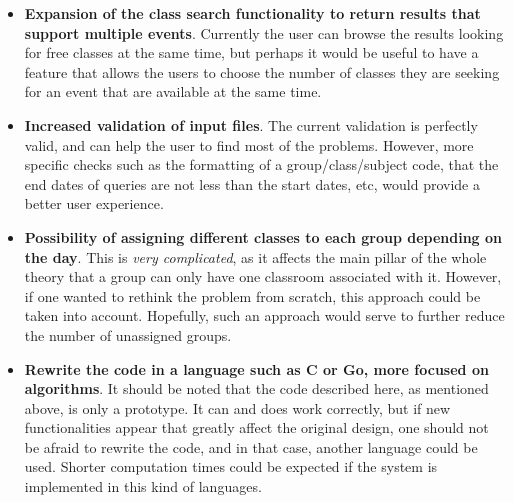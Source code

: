 \begin{itemize}
    \item \textbf{Expansion of the class search functionality to return results that support multiple events}. Currently the user can browse the results looking for free classes at the same time, but perhaps it would be useful to have a feature that allows the users to choose the number of classes they are seeking for an event that are available at the same time.
    \item \textbf{Increased validation of input files}. The current validation is perfectly valid, and can help the user to find most of the problems. However, more specific checks such as the formatting of a group/class/subject code, that the end dates of queries are not less than the start dates, etc, would provide a better user experience.
    \item \textbf{Possibility of assigning different classes to each group depending on the day}. This is \textit{very complicated}, as it affects the main pillar of the whole theory that a group can only have one classroom associated with it. However, if one wanted to rethink the problem from scratch, this approach could be taken into account. Hopefully, such an approach would serve to further reduce the number of unassigned groups.
    \item \textbf{Rewrite the code in a language such as C or Go, more focused on algorithms}. It should be noted that the code described here, as mentioned above, is only a prototype. It can and does work correctly, but if new functionalities appear that greatly affect the original design, one should not be afraid to rewrite the code, and in that case, another language could be used. Shorter computation times could be expected if the system is implemented in this kind of languages.
\end{itemize}


